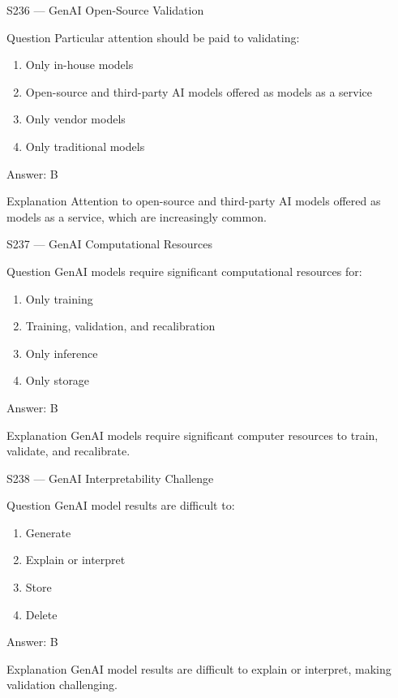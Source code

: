 \documentclass[aspectratio=169,8pt]{beamer}
\begin{document}
\begin{frame}{S236 --- GenAI Open-Source Validation}
	\begin{block}{Question}
		Particular attention should be paid to validating:
		\begin{enumerate}
			\item Only in-house models
			\item Open-source and third-party AI models offered as models as a service
			\item Only vendor models
			\item Only traditional models
		\end{enumerate}
	\end{block}
	\begin{exampleblock}{Answer: B}\end{exampleblock}
	\begin{block}{Explanation}
		Attention to open-source and third-party AI models offered as models as a service, which are increasingly common.
	\end{block}
\end{frame}

\begin{frame}{S237 --- GenAI Computational Resources}
	\begin{block}{Question}
		GenAI models require significant computational resources for:
		\begin{enumerate}
			\item Only training
			\item Training, validation, and recalibration
			\item Only inference
			\item Only storage
		\end{enumerate}
	\end{block}
	\begin{exampleblock}{Answer: B}\end{exampleblock}
	\begin{block}{Explanation}
		GenAI models require significant computer resources to train, validate, and recalibrate.
	\end{block}
\end{frame}

\begin{frame}{S238 --- GenAI Interpretability Challenge}
	\begin{block}{Question}
		GenAI model results are difficult to:
		\begin{enumerate}
			\item Generate
			\item Explain or interpret
			\item Store
			\item Delete
		\end{enumerate}
	\end{block}
	\begin{exampleblock}{Answer: B}\end{exampleblock}
	\begin{block}{Explanation}
		GenAI model results are difficult to explain or interpret, making validation challenging.
	\end{block}
\end{frame}
\end{document}
